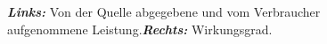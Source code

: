 \begin{figure}[H]
\quad
{}
\centering
\caption{\textbf{\textit{Links:}} Von der Quelle abgegebene und vom Verbraucher aufgenommene Leistung.\textbf{\textit{Rechts:}} Wirkungsgrad.}
\label{fig_IIIbb}
\end{figure}
